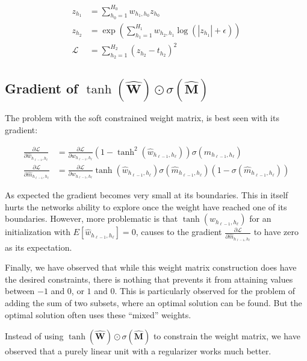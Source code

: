 \documentclass[a4paper]{article}
\begin{document}
\begin{equation}
\begin{aligned}
z_{h_1} &= \sum_{h_0=1}^{H_0} w_{h_1, h_0} z_{h_0} \\
z_{h_2} &= \exp\left(\sum_{h_1=1}^{H_1} w_{h_2, h_1} \log(|z_{h_1}| + \epsilon) \right) \\
\mathcal{L} &= \sum_{h_2=1}^{H_2} (z_{h_2} - t_{h_2})^2
\end{aligned}
\end{equation}


\subsection{Gradient of $\tanh(\hat{\mathbf{W}}) \odot \sigma(\hat{\mathbf{M}})$}

The problem with the soft constrained weight matrix, is best seen with its gradient:

\begin{equation}
\begin{aligned}
\frac{\partial \mathcal{L}}{\partial \hat{w}_{h_{\ell-1},h_\ell}} &= \frac{\partial \mathcal{L}}{\partial w_{h_{\ell-1},h_\ell}} (1 - \tanh^2(\hat{w}_{h_{\ell-1},h_\ell})) \sigma(\hat{m}_{h_{\ell-1},h_\ell}) \\
\frac{\partial \mathcal{L}}{\partial \hat{m}_{h_{\ell-1},h_\ell}} &= \frac{\partial \mathcal{L}}{\partial w_{h_{\ell-1},h_\ell}} \tanh(\hat{w}_{h_{\ell-1},h_\ell}) \sigma(\hat{m}_{h_{\ell-1},h_\ell}) (1 - \sigma(\hat{m}_{h_{\ell-1},h_\ell}))
\end{aligned}
\end{equation}

As expected the gradient becomes very small at its boundaries. This in itself hurts the networks ability to explore once the weight have reached one of its boundaries. However, more problematic is that $\tanh(\hat{w}_{h_{\ell-1},h_\ell})$ for an initialization with $E[\hat{w}_{h_{\ell-1},h_\ell}] = 0$, causes to the gradient $\frac{\partial \mathcal{L}}{\partial \hat{m}_{h_{\ell-1},h_\ell}}$ to have zero as its expectation.

Finally, we have observed that while this weight matrix construction does have the desired constraints, there is nothing that prevents it from attaining values between $-1$ and $0$, or $1$ and $0$. This is particularly observed for the problem of adding the sum of two subsets, where an optimal solution can be found. But the optimal solution often uses these ``mixed'' weights.

Instead of using $\tanh(\hat{\mathbf{W}}) \odot \sigma(\hat{\mathbf{M}})$ to constrain the weight matrix, we have observed that a purely linear unit with a regularizer works much better.
\end{document}
